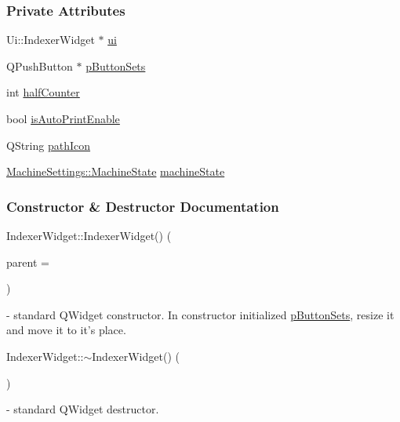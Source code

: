 \subsubsection*{Private Attributes}
\begin{DoxyCompactItemize}
\item 
Ui\+::\+Indexer\+Widget $\ast$ \mbox{\hyperlink{classIndexerWidget_acfec1850dc331214abc0eb65093a5896}{ui}}
\item 
Q\+Push\+Button $\ast$ \mbox{\hyperlink{classIndexerWidget_a9f5ddd2008811969c702188992f1a3da}{p\+Button\+Sets}}
\item 
int \mbox{\hyperlink{classIndexerWidget_a113ecc934dd986f975553c6a55d05523}{half\+Counter}}
\item 
bool \mbox{\hyperlink{classIndexerWidget_a7d299b2455b965aad9652489b957b618}{is\+Auto\+Print\+Enable}}
\item 
Q\+String \mbox{\hyperlink{classIndexerWidget_ad3787e740fc417fdcb74202c9953788f}{path\+Icon}}
\item 
\mbox{\hyperlink{classMachineSettings_a3d02f0565ba9c53dbb59d5d086208cad}{Machine\+Settings\+::\+Machine\+State}} \mbox{\hyperlink{classIndexerWidget_ad0cd90b88ff25e18b46f5af290c9dcae}{machine\+State}}
\end{DoxyCompactItemize}


\subsubsection{Constructor \& Destructor Documentation}
\mbox{\label{classIndexerWidget_a5406b617d20c983f0208d78813f46b13}} 
{\footnotesize\ttfamily Indexer\+Widget\+::\texorpdfstring{Indexer\+Widget()}{IndexerWidget()} (\begin{DoxyParamCaption}\item[{Q\+Widget $\ast$}]{parent = {} }\end{DoxyParamCaption}){\ttfamily [explicit]}} - standard Q\+Widget constructor. In constructor initialized  \hyperlink{classIndexerWidget_a9f5ddd2008811969c702188992f1a3da}{p\+Button\+Sets}, resize it and move it to it's place.

\mbox{\label{classIndexerWidget_a06e073bb57ddfdbfc21364f8344e10f3}} 
{\footnotesize\ttfamily Indexer\+Widget\+::\texorpdfstring{$\sim$\+Indexer\+Widget()}{~IndexerWidget()} (\begin{DoxyParamCaption}{ }\end{DoxyParamCaption})} - standard Q\+Widget destructor.

